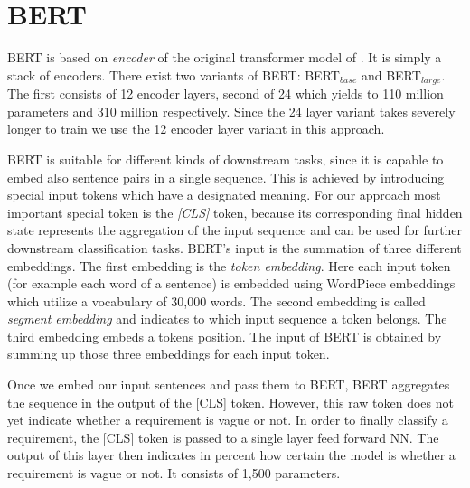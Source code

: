 \section{BERT}
\label{chp:approach:sec:BERT}

\Ac{BERT} is based on \textit{encoder} of the original transformer model of \textcite{Vaswani:2017}.
It is simply a stack of encoders.
There exist two variants of \ac{BERT}: \ac{BERT}$_{base}$ and \ac{BERT}$_{large}$.
The first consists of 12 encoder layers, second of 24 which yields to 110 million parameters and 310 million respectively.
Since the 24 layer variant takes severely longer to train we use the 12 encoder layer variant in this approach. \parencite{Devlin:2018}

\Ac{BERT} is suitable for different kinds of downstream tasks, since it is capable to embed also sentence pairs in a single sequence.
This is achieved by introducing special input tokens which have a designated meaning.
For our approach most important special token is the \textit{[CLS]} token, because its corresponding final hidden state represents the aggregation of the input sequence and can be used for further downstream classification tasks.
\Ac{BERT}'s input is the summation of three different embeddings.
The first embedding is the \textit{token embedding}.
Here each input token (for example each word of a sentence) is embedded using WordPiece embeddings \parencite{Wu:2016} which utilize a vocabulary of 30,000 words.
The second embedding is called \textit{segment embedding} and indicates to which input sequence a token belongs.
The third embedding embeds a tokens position.
The input of \ac{BERT} is obtained by summing up those three embeddings for each input token.

Once we embed our input sentences and pass them to \ac{BERT}, \ac{BERT} aggregates the sequence in the output of the [CLS] token.
However, this raw token does not yet indicate whether a requirement is vague or not.
In order to finally classify a requirement, the [CLS] token is passed to a single layer feed forward \ac{NN}.
The output of this layer then indicates in percent how certain the model is whether a requirement is vague or not.
It consists of 1,500 parameters.
